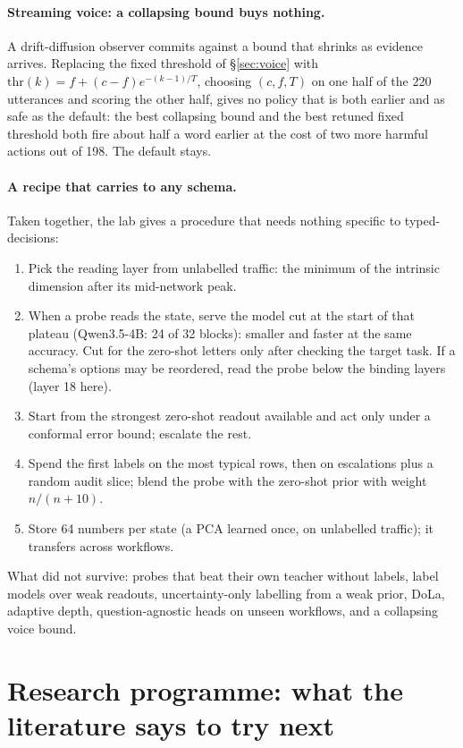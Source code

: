 \documentclass[11pt,a4paper]{article}
\begin{document}
\paragraph{Streaming voice: a collapsing bound buys nothing.} A drift-diffusion observer commits against a bound that shrinks as evidence arrives. Replacing the fixed threshold of \S\ref{sec:voice} with $\mathrm{thr}(k)=f+(c-f)e^{-(k-1)/T}$, choosing $(c,f,T)$ on one half of the 220 utterances and scoring the other half, gives no policy that is both earlier and as safe as the default: the best collapsing bound and the best retuned fixed threshold both fire about half a word earlier at the cost of two more harmful actions out of 198. The default stays.

\paragraph{A recipe that carries to any schema.} Taken together, the lab gives a procedure that needs nothing specific to typed-decisions:
\begin{enumerate}[leftmargin=*,itemsep=1pt]
\item Pick the reading layer from unlabelled traffic: the minimum of the intrinsic dimension after its mid-network peak.
\item When a probe reads the state, serve the model cut at the start of that plateau (Qwen3.5-4B: 24 of 32 blocks): smaller and faster at the same accuracy. Cut for the zero-shot letters only after checking the target task. If a schema's options may be reordered, read the probe below the binding layers (layer 18 here).
\item Start from the strongest zero-shot readout available and act only under a conformal error bound; escalate the rest.
\item Spend the first labels on the most typical rows, then on escalations plus a random audit slice; blend the probe with the zero-shot prior with weight $n/(n+10)$.
\item Store 64 numbers per state (a PCA learned once, on unlabelled traffic); it transfers across workflows.
\end{enumerate}
What did not survive: probes that beat their own teacher without labels, label models over weak readouts, uncertainty-only labelling from a weak prior, DoLa, adaptive depth, question-agnostic heads on unseen workflows, and a collapsing voice bound.

\section{Research programme: what the literature says to try next}
\label{sec:programme}
\end{document}
